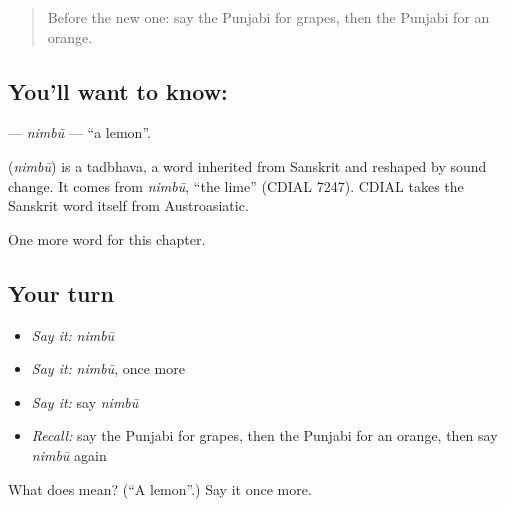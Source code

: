 \begin{quote}
Before the new one: say the Punjabi for grapes, then the Punjabi for an orange.
\end{quote}

\subsection*{You'll want to know: }
\textbf{} — \emph{nimbū} — \textquotedblleft{}a lemon\textquotedblright{}.

\begin{cousinweb}
\textbf{} (\emph{nimbū}) is a tadbhava, a word inherited from Sanskrit and reshaped by sound change. It comes from \emph{nimbū}, \textquotedblleft{}the lime\textquotedblright{} (CDIAL 7247). CDIAL takes the Sanskrit word itself from Austroasiatic.
\end{cousinweb}

\begin{grammarlens}[title={What you've built}]
One more word for this chapter.
\end{grammarlens}

\subsection*{Your turn}
\begin{itemize}
\raggedright
  \item \emph{Say it:} \emph{nimbū}
  \item \emph{Say it:} \emph{nimbū}, once more
  \item \emph{Say it:} say \emph{nimbū}
  \item \emph{Recall:} say the Punjabi for grapes, then the Punjabi for an orange, then say \emph{nimbū} again
\end{itemize}

\begin{tcolorbox}[breakable,colback=teal!4,colframe=teal!35!black,title={Before you move on}]
What does  mean? (\textquotedblleft{}A lemon\textquotedblright{}.) Say it once more.
\end{tcolorbox}
